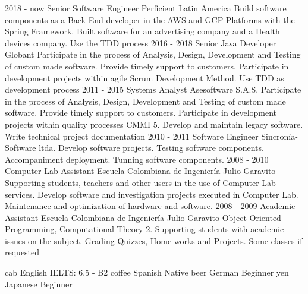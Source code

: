 \documentclass[icon]{twentysecondcv}
\begin{document}
\begin{twenty}
\twentyitem
    {2018 - now}
    {Senior Software Engineer}
    {Perficient Latin America}
    {Build software components as a Back End developer in the AWS and GCP Platforms with the Spring Framework. Built software for an advertising company and a Health devices company. Use the TDD process}
\twentyitem
    {2016 - 2018}
    {Senior Java Developer}
    {Globant}
    {Participate in the process of Analysis, Design, Development and Testing of custom made software. Provide timely support to customers. Participate in development projects within agile Scrum Development Method. Use TDD as development process}
  \twentyitem
    {2011 - 2015}
    {Systems Analyst}
    {Asesoftware S.A.S.}
    {Participate in the process of Analysis, Design, Development and Testing of custom made software. Provide timely support to customers. Participate in development projects within quality processes CMMI 5. Develop and maintain legacy software. Write technical project documentation}
  \twentyitem
    {2010 - 2011}
    {Software Engineer}
    {Sincron\'ia-Software ltda.}
    {Develop software projects. Testing software components. Accompaniment deployment. Tunning software components.}
\twentyitem
    {2008 - 2010}
    {Computer Lab Assistant}
    {Escuela Colombiana de Ingenier\'ia  Julio Garavito}
    {Supporting students, teachers and other users in the use of Computer Lab services. Develop software and investigation projects executed in Computer Lab. Maintenance and optimization of hardware and software.}
\twentyitem
    {2008 - 2009}
    {Academic Assistant}
    {Escuela Colombiana de Ingenier\'ia  Julio Garavito}
    {Object Oriented Programming, Computational Theory 2. Supporting students with academic issues on the subject. Grading Quizzes, Home works and Projects. Some classes if requested}

\end{twenty}


\begin{twentyshorticon}
  \twentyitemshorticon
    {cab}
    {English}
    {IELTS: 6.5 - B2}
  \twentyitemshorticon
    {coffee}
    {Spanish}
    {Native}
  \twentyitemshorticon
    {beer}
    {German}
    {Beginner}
  \twentyitemshorticon
    {yen}
    {Japanese}
    {Beginner}
\end{twentyshorticon}


\end{document}
